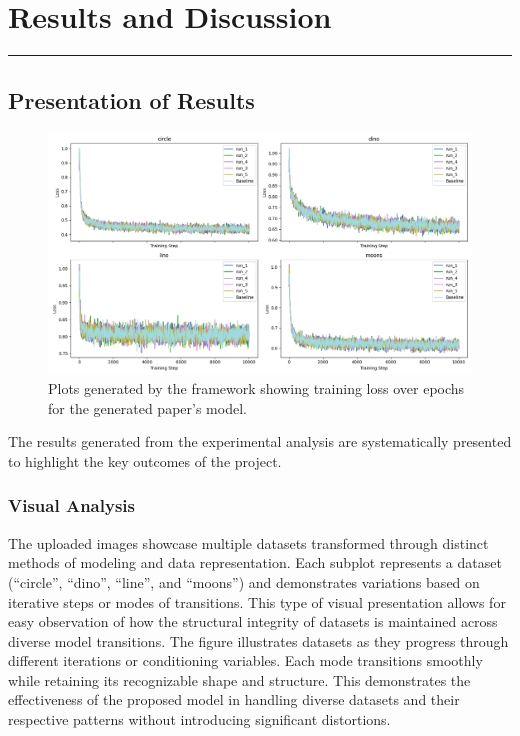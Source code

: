 \chapter{Results and Discussion}
\vspace{-1.5cm}
\hspace{-1cm}\rule{19cm}{0.4pt} 

\section{Presentation of Results}
\begin{figure}[hb]
    \centering
    \includegraphics[width=\textwidth, height=0.7\textwidth]{images/train_loss.png}
    \caption{Plots generated by the framework showing training loss over epochs for the generated paper's model.}
    \label{fig:output_d} %
\end{figure}
The results generated from the experimental analysis are systematically presented to highlight the key outcomes of the project.
\subsection{Visual Analysis}
The uploaded images showcase multiple datasets transformed through distinct methods of modeling and data representation. Each subplot represents a dataset (``circle'', ``dino'', ``line'', and ``moons'') and demonstrates variations based on iterative steps or modes of transitions. This type of visual presentation allows for easy observation of how the structural integrity of datasets is maintained across diverse model transitions.
    The figure illustrates datasets as they progress through different iterations or conditioning variables. Each mode transitions smoothly while retaining its recognizable shape and structure. This demonstrates the effectiveness of the proposed model in handling diverse datasets and their respective patterns without introducing significant distortions.

